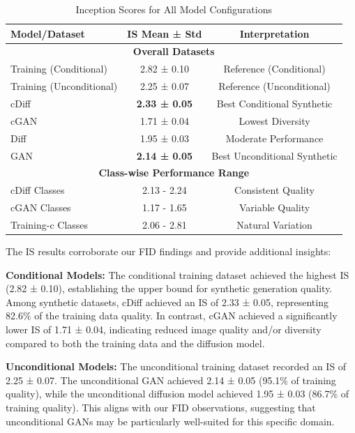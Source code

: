 \begin{table}[htbp]
\centering
\caption{Inception Scores for All Model Configurations}
\label{tab:inception_scores}
\begin{tabular}{|l|c|c|}
\hline
\textbf{Model/Dataset} & \textbf{IS Mean ± Std} & \textbf{Interpretation} \\
\hline
\multicolumn{3}{|c|}{\textbf{Overall Datasets}} \\
\hline
Training (Conditional) & 2.82 ± 0.10 & Reference (Conditional) \\
Training (Unconditional) & 2.25 ± 0.07 & Reference (Unconditional) \\
cDiff & \textbf{2.33 ± 0.05} & Best Conditional Synthetic \\
cGAN & 1.71 ± 0.04 & Lowest Diversity \\
Diff & 1.95 ± 0.03 & Moderate Performance \\
GAN & \textbf{2.14 ± 0.05} & Best Unconditional Synthetic \\
\hline
\multicolumn{3}{|c|}{\textbf{Class-wise Performance Range}} \\
\hline
cDiff Classes & 2.13 - 2.24 & Consistent Quality \\
cGAN Classes & 1.17 - 1.65 & Variable Quality \\
Training-c Classes & 2.06 - 2.81 & Natural Variation \\
\hline
\end{tabular}
\end{table}

The IS results corroborate our FID findings and provide additional insights:

\textbf{Conditional Models:} The conditional training dataset achieved the highest IS (2.82 ± 0.10), establishing the upper bound for synthetic generation quality. Among synthetic datasets, cDiff achieved an IS of 2.33 ± 0.05, representing 82.6\% of the training data quality. In contrast, cGAN achieved a significantly lower IS of 1.71 ± 0.04, indicating reduced image quality and/or diversity compared to both the training data and the diffusion model.

\textbf{Unconditional Models:} The unconditional training dataset recorded an IS of 2.25 ± 0.07. The unconditional GAN achieved 2.14 ± 0.05 (95.1\% of training quality), while the unconditional diffusion model achieved 1.95 ± 0.03 (86.7\% of training quality). This aligns with our FID observations, suggesting that unconditional GANs may be particularly well-suited for this specific domain.

